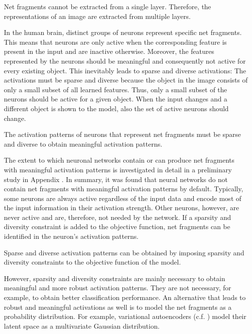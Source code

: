 \begin{implementation}
	Net fragments cannot be extracted from a single layer. Therefore, the representations of an image are extracted from multiple layers.
\end{implementation}

In the human brain, distinct groups of neurons represent specific net fragments.
This means that neurons are only active when the corresponding feature is present in the input and are inactive otherwise.
Moreover, the features represented by the neurons should be meaningful and consequently not active for every existing object.
This inevitably leads to sparse and diverse activations:
The activations must be sparse and diverse because the object in the image consists of only a small subset of all learned features. Thus, only a small subset of the neurons should be active for a given object.
When the input changes and a different object is shown to the model, also the set of active neurons should change.

\begin{claim}
	The activation patterns of neurons that represent net fragments must be sparse and diverse to obtain meaningful activation patterns.
\end{claim}

The extent to which neuronal networks contain or can produce net fragments with meaningful activation patterns is investigated in detail in a preliminary study in Appendix .
In summary, it was found that neural networks do not contain net fragments with meaningful activation patterns by default. Typically, some neurons are always active regardless of the input data and encode most of the input information in their activation strength.
Other neurons, however, are never active and are, therefore, not needed by the network.
If a sparsity and diversity constraint is added to the objective function, net fragments can be identified in the neuron's activation patterns.

\begin{implementation}
	Sparse and diverse activation patterns can be obtained by imposing sparsity and diversity constraints to the objective function of the model.
\end{implementation}

However, sparsity and diversity constraints are mainly necessary to obtain meaningful and more robust activation patterns.
They are not necessary, for example,  to obtain better classification performance.
An alternative that leads to robust and meaningful activations as well is to model the net fragments as a probability distribution.
For example, variational autoencoders (c.f. ) model their latent space as a multivariate Gaussian distribution.

